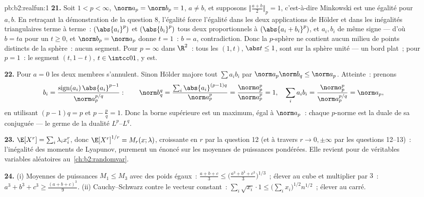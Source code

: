 \begin{solution}{pb:b2:realfun:1}
\textbf{21.} Soit $1 < p < \infty$, $\norm a_p = \norm b_p = 1$,
$a \neq b$, et supposons $\bigl\Vert\frac{a+b}2\bigr\Vert_p = 1$,
c'est-à-dire Minkowski est une égalité pour $a, b$. En retraçant la
démonstration de la question 8, l'égalité force l'égalité dans les
deux applications de Hölder et dans les inégalités triangulaires
terme à terme~: $(\abs{a_i}^p)$ et $(\abs{b_i}^p)$ tous deux
proportionnels à $(\abs{a_i + b_i}^p)$, et $a_i, b_i$ de même signe
--- d'où $b = ta$ pour un $t \geq 0$, et $\norm b_p = \norm a_p$
donne $t = 1$~: $b = a$, contradiction. Donc la $p$-sphère ne
contient aucun milieu de points distincts de la sphère~: aucun
segment. Pour $p = \infty$ dans $\R^2$~: tous les $(1, t)$,
$\abs t \leq 1$, sont sur la sphère unité --- un bord plat~; pour
$p = 1$~: le segment $(t, 1 - t)$, $t \in \intcc01$, y est.

\textbf{22.} Pour $a = 0$ les deux membres s'annulent. Sinon Hölder
majore tout $\sum a_ib_i$ par $\norm a_p\norm b_q \leq \norm
a_p$. Atteinte~: prenons
\[
b_i = \frac{\operatorname{sign}(a_i)\,\abs{a_i}^{p-1}}
{\norm a_p^{p/q}} :
\qquad
\norm b_q^q = \frac{\sum_i\abs{a_i}^{(p-1)q}}{\norm a_p^{p}}
= \frac{\norm a_p^p}{\norm a_p^p} = 1,
\quad
\sum_ia_ib_i = \frac{\norm a_p^p}{\norm a_p^{p/q}} =
\norm a_p ,
\]
en utilisant $(p-1)q = p$ et $p - \frac pq = 1$. Donc la borne
supérieure est un maximum, égal à $\norm a_p$~: chaque $p$-norme est
la  duale de sa conjuguée --- le germe de la dualité
$L^p$--$L^q$.

\textbf{23.} $\E[X^r] = \sum_i\lambda_ix_i^r$, donc
$\E[X^r]^{1/r} = M_r(x; \lambda)$, croissante en $r$ par la
question 12 (et à travers $r \to 0, \pm\infty$ par les questions
12--13)~: l'inégalité des moments de Lyapunov, purement un énoncé sur
les moyennes de puissances pondérées. Elle revient pour de véritables
variables aléatoires au~\cref{ch:b2:randomvar}.

\textbf{24.} (i) Moyennes de puissances $M_1 \leq M_3$ avec des
poids égaux~: $\frac{a+b+c}3 \leq \bigl(\frac{a^3+b^3+c^3}3\bigr)^{1/3}$~;
élever au cube et multiplier par $3$~: $a^3 + b^3 + c^3 \geq
\frac{(a+b+c)^3}9$. (ii) Cauchy--Schwarz contre le vecteur
constant~: $\sum_i\sqrt{x_i}\cdot1 \leq
\bigl(\sum_ix_i\bigr)^{1/2}n^{1/2}$~; élever au carré.


\end{solution}
